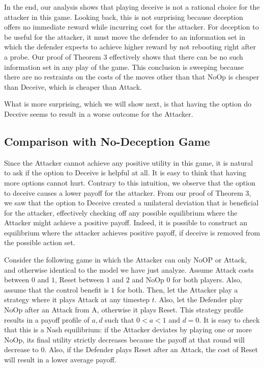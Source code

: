 \documentclass[11pt]{article}
\theoremstyle{plain}
\begin{document}
In the end, our analysis shows that playing deceive is not a rational choice for the attacker in this game. Looking back, this is not surprising because deception offers no immediate reward while incurring cost for the attacker. {For deception to be useful for the attacker, it must move the defender to an information set in which the defender expects to achieve higher reward by not rebooting right after a probe.} Our proof of Theorem 3 effectively shows that there can be no such information set in any play of the game. This conclusion is sweeping because there are no restraints on the costs of the moves other than that NoOp is cheaper than Deceive, which is cheaper than Attack.

What is more surprising, which we will show next, is that having the option do Deceive seems to result in a worse outcome for the Attacker.

\subsection{Comparison with No-Deception Game}

Since the Attacker cannot achieve any positive utility in this game, it is natural to ask if the option to Deceive is helpful at all. It is easy to think that having more options cannot hurt. Contrary to this intuition, we observe that the option to deceive causes a lower payoff for the attacker. From our proof of Theorem 3, we saw that the option to Deceive created a unilateral deviation that is beneficial for the attacker, effectively checking off any possible equilibrium where the Attacker might achieve a positive payoff. Indeed, it is possible to construct an equilibrium where the attacker achieves positive payoff, if deceive is removed from the possible action set.

Consider the following game in which the Attacker can only NoOP or Attack, and otherwise identical to the model we have just analyze. Assume Attack costs between $0$ and $1$, Reset between $1$ and $2$ and NoOp $0$ for both players. Also, assume that the control benefit is $1$ for both. Then, let the Attacker play a strategy where it plays Attack at any timestep $t$. Also, let the Defender play NoOp after an Attack from A, otherwise it plays Reset. This strategy profile results in a payoff profile of $a,d$ such that $0<a<1$ and $d=0$. It is easy to check that this is a Nash equilibrium: if the Attacker deviates by playing one or more NoOp, its final utility strictly decreases because the payoff at that round will decrease to 0. Also, if the Defender plays Reset after an Attack, the cost of Reset will result in a lower average payoff.
\end{document}
